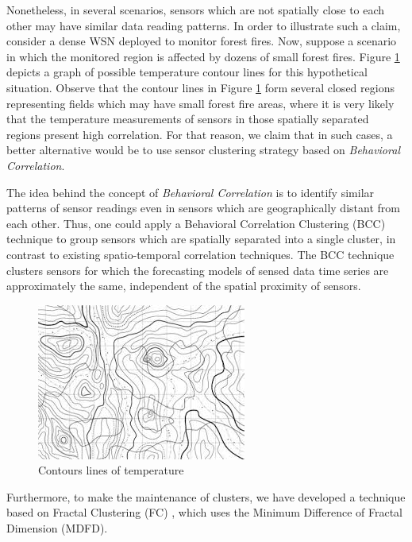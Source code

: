 \documentclass{acm_proc_article-sp}
\begin{document}
Nonetheless, in several scenarios, sensors which are not spatially close to each
other may have similar data reading patterns. In order to illustrate such a
claim, consider a dense WSN deployed to monitor forest fires.
Now, suppose a scenario in which the monitored region is affected by dozens of
small forest fires. Figure \ref{fig:contour_lines} depicts a graph of possible
temperature contour lines for this hypothetical situation. Observe that the
contour lines in Figure \ref{fig:contour_lines} form several closed regions
representing fields which may have small forest fire areas, where it is very
likely that the temperature measurements of sensors in those spatially separated
regions present high correlation. For that reason, we claim that in such cases,
a better alternative would be to use sensor clustering strategy based on
\textit{Behavioral Correlation}.
\vspace*{-.3cm}

The idea behind the concept of {\it Behavioral Correlation} is to identify
similar patterns of sensor readings even in sensors which are geographically
distant from each other. Thus, one could apply a Behavioral Correlation
Clustering (BCC) technique to group sensors which are spatially separated into a
single cluster, in contrast to existing spatio-temporal correlation techniques.
The BCC technique clusters sensors for which the forecasting models of sensed
data time series are approximately the same, independent of the spatial
proximity of sensors.
\vspace*{-.3cm}

\begin{figure}[!htb]
\centering
	\includegraphics[scale=0.9]{I2.png}
    \caption{Contours lines of temperature}
    \label{fig:contour_lines}
\end{figure}
\vspace*{-.3cm}

Furthermore, to make the maintenance of clusters, we have developed a technique
based on Fractal Clustering (FC) \cite{Barbara1999}, which uses the Minimum
Difference of Fractal Dimension (MDFD). 
\vspace*{-.3cm}
\end{document}
